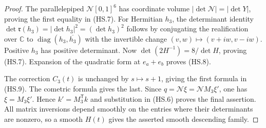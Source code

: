 \begin{proof}
The parallelepiped $\mathcal N[0,1]^6$ has coordinate volume
$|\det\mathcal N|=|\det Y|$, proving the first equality in (HS.7).
For Hermitian $h_3$, the determinant identity
$\det\mathfrak r(h_3)=|\det h_3|^2=(\det h_3)^2$
follows by conjugating the realification over $\mathbb C$ to
$\operatorname{diag}(h_3,\overline{h_3})$ with the invertible change
$(v,w)\mapsto(v+iw,v-iw)$. Positive $h_3$ has positive determinant.
Now $\det(2H^{-1})=8/\det H$, proving (HS.7).
Expansion of the quadratic form at $e_a+e_b$ proves (HS.8).

The correction $C_3(t)$ is unchanged by $s\mapsto s+1$, giving the
first formula in (HS.9). The cometric formula gives the last.
Since $q=\mathcal N\xi=\mathcal N M_3\xi'$, one has
$\xi=M_3\xi'$. Hence $k'=M_3^{\mathsf T}k$ and substitution in
(HS.6) proves the final assertion. All matrix inversions depend
smoothly on the entries where their determinants are nonzero, so a
smooth $H(t)$ gives the asserted smooth descending family.
\end{proof}

